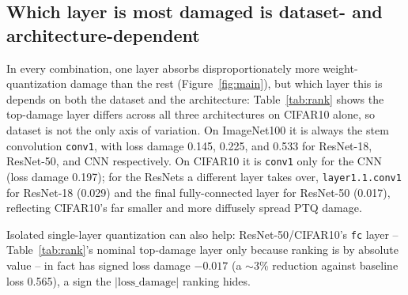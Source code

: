 \documentclass{article}
\begin{document}
\subsection{Which layer is most damaged is dataset- and architecture-dependent}
In every combination, one layer absorbs disproportionately more weight-quantization damage than the rest (Figure~\ref{fig:main}), but which layer this is depends on both the dataset and the architecture: Table~\ref{tab:rank} shows the top-damage layer differs across all three architectures on CIFAR10 alone, so dataset is not the only axis of variation. On ImageNet100 it is always the stem convolution \texttt{conv1}, with loss damage 0.145, 0.225, and 0.533 for ResNet-18, ResNet-50, and CNN respectively. On CIFAR10 it is \texttt{conv1} only for the CNN (loss damage 0.197); for the ResNets a different layer takes over, \texttt{layer1.1.conv1} for ResNet-18 (0.029) and the final fully-connected layer for ResNet-50 (0.017), reflecting CIFAR10's far smaller and more diffusely spread PTQ damage.


Isolated single-layer quantization can also help: ResNet-50/CIFAR10's \texttt{fc} layer -- Table~\ref{tab:rank}'s nominal top-damage layer only because ranking is by absolute value -- in fact has signed loss damage $-0.017$ (a $\sim$3\% reduction against baseline loss 0.565), a sign the $|\mathrm{loss\_damage}|$ ranking hides.
\end{document}

